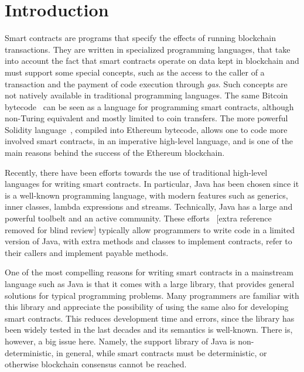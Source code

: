 \section{Introduction}\label{sec:introduction}

Smart contracts are programs that specify the effects of running blockchain transactions.
They are written in specialized programming languages, that take into account
the fact that smart contracts operate on data kept in blockchain and must
support some special concepts, such as the access to the caller of a transaction
and the payment of code execution through \emph{gas}.
Such concepts are not natively available
in traditional programming languages.
The same Bitcoin bytecode~\cite{Antonopoulos17,Nakamoto08}
can be seen as a language for programming smart contracts,
although non-Turing equivalent and mostly limited to coin transfers. The more
powerful Solidity language~\cite{AntonopoulosW18},
compiled into Ethereum bytecode, allows one to code
more involved smart contracts, in an imperative high-level language, and is
one of the main reasons behind the success of the Ethereum blockchain.

Recently, there have been efforts towards the use of traditional
high-level languages for writing smart contracts. In particular, Java has
been chosen since it is a well-known programming language,
with modern features such as generics, inner classes, lambda
expressions and streams. Technically, Java has
a large and powerful toolbelt and an active community.
These efforts~\cite{aion,aion_example_contract,neo,neo_contract}
[extra reference removed for blind review]
typically allow programmers to write code in a limited version of Java,
with extra methods and classes to implement contracts, refer to their
callers and implement payable methods.

One of the most compelling reasons for writing smart contracts
in a mainstream language such as Java is that it comes with a large
library, that provides general solutions for typical programming problems.
Many programmers are familiar with this library and appreciate the possibility
of using the same also for developing smart contracts. This reduces
development time and errors, since the library has been widely tested
in the last decades and its semantics is well-known. There is, however, a big
issue here. Namely, the support library of Java is non-deterministic, in general,
while smart contracts must be deterministic, or otherwise blockchain consensus
cannot be reached.

